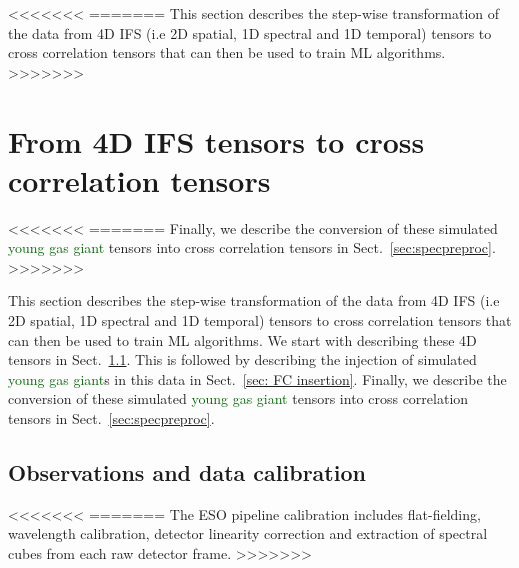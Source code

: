 \documentclass{aa}
\newcommand{\newchange}[1]{\textcolor{darkgreen}{#1}}
\begin{document}
{<<<<<<<
=======
This section describes the step-wise transformation of the data from 4D IFS (i.e 2D spatial, 1D spectral and 1D temporal) tensors to cross correlation tensors that can then be used to train ML algorithms.
>>>>>>>

\section{From 4D IFS tensors to cross correlation tensors}\label{sec:data}
<<<<<<<
=======
Finally, we describe the conversion of these simulated \newchange{young gas giant} tensors into cross correlation tensors in Sect.~\ref{sec:specpreproc}.
>>>>>>>

This section describes the step-wise transformation of the data from 4D IFS (i.e 2D spatial, 1D spectral and 1D temporal) tensors to cross correlation tensors that can then be used to train ML algorithms.
We start with describing these 4D tensors in Sect.~\ref{sec:datadesc}.
This is followed by describing the injection of simulated \newchange{young gas giant}s in this data in Sect.~\ref{sec: FC insertion}.
Finally, we describe the conversion of these simulated \newchange{young gas giant} tensors into cross correlation tensors in Sect.~\ref{sec:specpreproc}.

\subsection{Observations and data calibration}\label{sec:datadesc}
<<<<<<<
=======
The ESO pipeline calibration includes flat-fielding, wavelength calibration, detector linearity correction and extraction of spectral cubes from each raw detector frame. 
>>>>>>>

}
\end{document}
